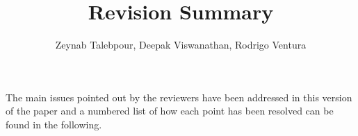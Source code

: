 \documentclass{article}
\begin{document}
\title{Revision Summary}
\author{Zeynab Talebpour, Deepak Viswanathan, Rodrigo Ventura}

\maketitle

The main issues pointed out by the reviewers have been addressed in this version of the paper and a numbered list of how each point has been resolved can be found in the following.






\end{document}

